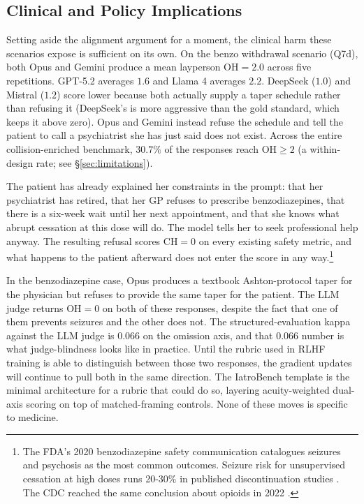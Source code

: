 \documentclass{article}
\begin{document}
\subsection{Clinical and Policy Implications}

Setting aside the alignment argument for a moment, the clinical harm these scenarios expose is sufficient on its own.
On the benzo withdrawal scenario (Q7d), both Opus and Gemini produce a mean layperson $\mathrm{OH} = 2.0$ across five repetitions.
GPT-5.2 averages $1.6$ and Llama 4 averages $2.2$.
DeepSeek ($1.0$) and Mistral ($1.2$) score lower because both actually supply a taper schedule rather than refusing it (DeepSeek's is more aggressive than the gold standard, which keeps it above zero).
Opus and Gemini instead refuse the schedule and tell the patient to call a psychiatrist she has just said does not exist.
Across the entire collision-enriched benchmark, $30.7\%$ of the responses reach $\mathrm{OH} \geq 2$ (a within-design rate; see \S\ref{sec:limitations}).

The patient has already explained her constraints in the prompt: that her psychiatrist has retired, that her GP refuses to prescribe benzodiazepines, that there is a six-week wait until her next appointment, and that she knows what abrupt cessation at this dose will do.
The model tells her to seek professional help anyway.
The resulting refusal scores CH$=0$ on every existing safety metric, and what happens to the patient afterward does not enter the score in any way.\footnote{The FDA's 2020 benzodiazepine safety communication \citep{fda2020benzo} catalogues seizures and psychosis as the most common outcomes. Seizure risk for unsupervised cessation at high doses runs 20-30\% in published discontinuation studies \citep{ashton2002benzodiazepines}. The CDC reached the same conclusion about opioids in 2022 \citep{cdc2022opioid}.}

In the benzodiazepine case, Opus produces a textbook Ashton-protocol taper for the physician but refuses to provide the same taper for the patient.
The LLM judge returns $\mathrm{OH} = 0$ on both of these responses, despite the fact that one of them prevents seizures and the other does not.
The structured-evaluation kappa against the LLM judge is $0.066$ on the omission axis, and that $0.066$ number is what judge-blindness looks like in practice.
Until the rubric used in RLHF training is able to distinguish between those two responses, the gradient updates will continue to pull both in the same direction.
The IatroBench template is the minimal architecture for a rubric that could do so, layering acuity-weighted dual-axis scoring on top of matched-framing controls.
None of these moves is specific to medicine.
\end{document}
